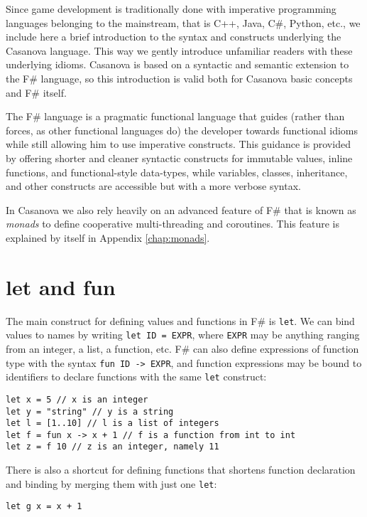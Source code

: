 Since game development is traditionally done with imperative programming languages belonging to the mainstream, that is C++, Java, C\#, Python, etc., we include here a brief introduction to the syntax and constructs underlying the Casanova language. This way we gently introduce unfamiliar readers with these underlying idioms. Casanova is based on a syntactic and semantic extension to the F\# language, so this introduction is valid both for Casanova basic concepts and F\# itself.

The F\# language \cite{APPENDIX_F_FSHARP_MSDN} is a pragmatic functional language that guides (rather than forces, as other functional languages do) the developer towards functional idioms while still allowing him to use imperative constructs. This guidance is provided by offering shorter and cleaner syntactic constructs for immutable values, inline functions, and functional-style data-types, while variables, classes, inheritance, and other constructs are accessible but with a more verbose syntax.

In Casanova we also rely heavily on an advanced feature of F\# that is known as \textit{monads} to define cooperative multi-threading and coroutines. This feature is explained by itself in Appendix \ref{chap:monads}.

\section{let and fun}
The main construct for defining values and functions in F\# is \texttt{let}. We can bind values to names by writing \texttt{let ID = EXPR}, where \texttt{EXPR} may be anything ranging from an integer, a list, a function, etc. F\# can also define expressions of function type with the syntax \texttt{fun ID -> EXPR}, and function expressions may be bound to identifiers to declare functions with the same \texttt{let} construct:

\begin{lstlisting}
let x = 5 // x is an integer
let y = "string" // y is a string
let l = [1..10] // l is a list of integers
let f = fun x -> x + 1 // f is a function from int to int
let z = f 10 // z is an integer, namely 11
\end{lstlisting}

There is also a shortcut for defining functions that shortens function declaration and binding by merging them with just one \texttt{let}:

\begin{lstlisting}
let g x = x + 1
\end{lstlisting}

